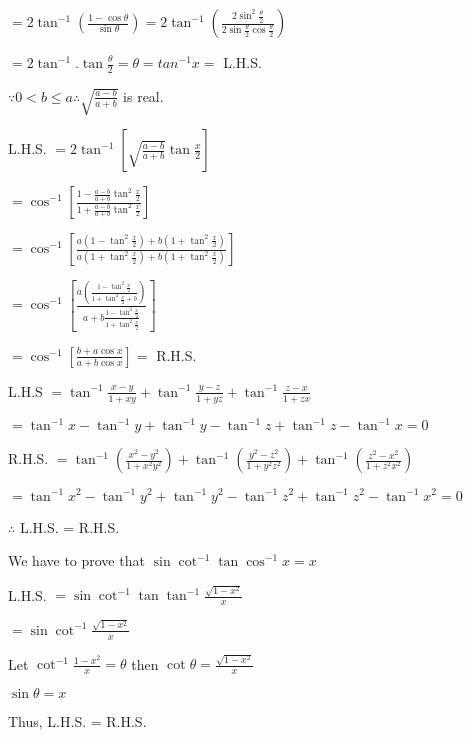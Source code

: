   $=2\tan^{-1}\left(\frac{1 - \cos\theta}{\sin\theta}\right) =
  2\tan^{-1}\left(\frac{2\sin^2\frac{\theta}{2}}{2\sin\frac{\theta}{2}\cos\frac{\theta}{2}}\right)$

  $= 2\tan^{-1}.\tan\frac{\theta}{2} = \theta = tan^{-1}x =$ L.H.S.

\item $\because 0 < b \leq a \therefore \sqrt{\frac{a - b}{a + b}}$ is real.

  L.H.S. $= 2\tan^{-1}\left[\sqrt{\frac{a - b}{a + b}}\tan\frac{x}{2}\right]$

  $= \cos^{-1}\left[\frac{1 - \frac{a- b}{a + b}\tan^2\frac{x}{2}}{1 + \frac{a - b}{a + b}\tan^2\frac{x}{2}}\right]$

  $= \cos^{-1}\left[\frac{a\left(1 - \tan^2\frac{x}{2}\right)+ b\left(1 + \tan^2\frac{x}{2}\right)}{a\left(1 +
      \tan^2\frac{x}{2}\right)+ b\left(1 + \tan^2\frac{x}{2}\right)}\right]$

  $= \cos^{-1}\left[\frac{a\left(\frac{1 - \tan^2\frac{x}{2}}{1 + \tan^2\frac{x}{2} + b}\right)}{a + b\frac{1 -
        \tan^2\frac{x}{2}}{1 + \tan^2\frac{x}{2}}}\right]$

  $= \cos^{-1}\left[\frac{b + a\cos x}{a + b\cos x}\right] =$ R.H.S.

\item L.H.S $= \tan^{-1}\frac{x - y}{1 + xy} + \tan^{-1}\frac{y - z}{1 + yz} + \tan^{-1}\frac{z - x}{1 + zx}$

  $= \tan^{-1}x - \tan^{-1}y + \tan^{-1}y - \tan^{-1}z + \tan^{-1}z - \tan^{-1}x = 0$

  R.H.S. $= \tan^{-1}\left(\frac{x^2 - y^2}{1 + x^2y^2}\right) + \tan^{-1}\left(\frac{y^2 - z^2}{1 + y^2z^2}\right) +
  \tan^{-1}\left(\frac{z^2 - x^2}{1 + z^2x^2}\right)$

  $= \tan^{-1}x^2 - \tan^{-1}y^2 + \tan^{-1}y^2 - \tan^{-1}z^2 + \tan^{-1}z^2 - \tan^{-1}x^2 = 0$

  $\therefore$ L.H.S. = R.H.S.

\item We have to prove that $\sin\cot^{-1}\tan\cos^{-1}x = x$

  L.H.S. $= \sin\cot^{-1}\tan\tan^{-1}\frac{\sqrt{1 - x^2}}{x}$

  $= \sin\cot^{-1}\frac{\sqrt{1 - x^2}}{x}$

  Let $\cot^{-1}\frac{1 - x^2}{x} = \theta$ then $\cot\theta = \frac{\sqrt{1 - x^2}}{x}$

  $\sin\theta = x$

  Thus, L.H.S. = R.H.S.

